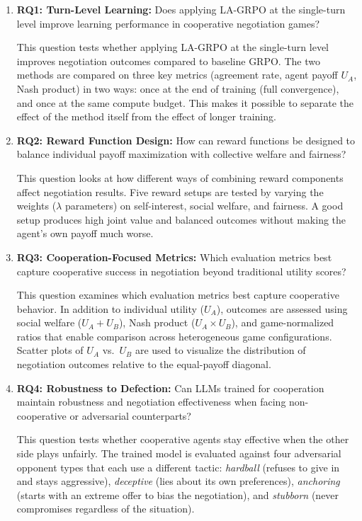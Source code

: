 \documentclass[12pt,a4paper]{article}
\begin{document}
\begin{enumerate}[label={}, leftmargin=0pt, itemsep=1.2em]
    \item \textbf{RQ1: Turn-Level Learning:} Does applying LA-GRPO at the single-turn level improve learning performance in cooperative negotiation games?
    \par This question tests whether applying LA-GRPO at the single-turn level improves negotiation outcomes compared to baseline GRPO. The two methods are compared on three key metrics (agreement rate, agent payoff $U_A$, Nash product) in two ways: once at the end of training (full convergence), and once at the same compute budget. This makes it possible to separate the effect of the method itself from the effect of longer training.

    \item \textbf{RQ2: Reward Function Design:} How can reward functions be designed to balance individual payoff maximization with collective welfare and fairness?
    \par This question looks at how different ways of combining reward components affect negotiation results. Five reward setups are tested by varying the weights ($\lambda$ parameters) on self-interest, social welfare, and fairness. A good setup produces high joint value and balanced outcomes without making the agent's own payoff much worse.

    \item \textbf{RQ3: Cooperation-Focused Metrics:} Which evaluation metrics best capture cooperative success in negotiation beyond traditional utility scores?
    \par This question examines which evaluation metrics best capture cooperative behavior. In addition to individual utility ($U_A$), outcomes are assessed using social welfare ($U_A + U_B$), Nash product ($U_A \times U_B$), and game-normalized ratios that enable comparison across heterogeneous game configurations. Scatter plots of $U_A$ vs.\ $U_B$ are used to visualize the distribution of negotiation outcomes relative to the equal-payoff diagonal.

    \item \textbf{RQ4: Robustness to Defection:} Can LLMs trained for cooperation maintain robustness and negotiation effectiveness when facing non-cooperative or adversarial counterparts?
    \par This question tests whether cooperative agents stay effective when the other side plays unfairly. The trained model is evaluated against four adversarial opponent types that each use a different tactic: \emph{hardball} (refuses to give in and stays aggressive), \emph{deceptive} (lies about its own preferences), \emph{anchoring} (starts with an extreme offer to bias the negotiation), and \emph{stubborn} (never compromises regardless of the situation).


\end{enumerate}
\end{document}
